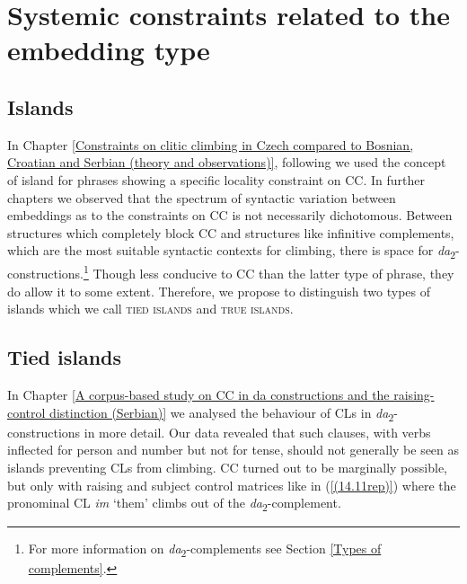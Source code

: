 \section{Systemic constraints related to the embedding type}
\label{Systemic constraints related to the embedding type}
\subsection{Islands}
\label{Islands}

In Chapter \ref{Constraints on clitic climbing in Czech compared to Bosnian, Croatian and Serbian (theory and observations)}, following \citet[][245]{FranksKing00} we used the concept of island for phrases showing a specific locality constraint on CC. In further chapters we observed that the spectrum of syntactic variation between embeddings as to the constraints on CC is not necessarily dichotomous. Between structures which completely block CC and structures like infinitive complements, which are the most suitable syntactic contexts for climbing, there is space for \textit{da}\textsubscript{2}-con\-struc\-tions.\footnote{For more information on \textit{da}\textsubscript{2}-complements see Section \ref{Types of complements}.} Though less conducive to CC than the latter type of phrase, they do allow it to some extent. Therefore, we propose to distinguish two types of islands which we call \textsc{tied} \textsc{islands} and \textsc{true islands}. 

\subsection{Tied islands}
\label{Tied islands}

In Chapter \ref{A corpus-based study on CC in da constructions and the raising-control distinction (Serbian)} we analysed the behaviour of CLs in \textit{da}\textsubscript{2}-constructions in more detail. Our data revealed that such clauses, with verbs inflected for person and number but not for tense, should not generally be seen as islands preventing CLs from climbing. CC turned out to be marginally possible, but only with raising and subject control matrices like in (\ref{(14.11rep)}) where the pronominal CL \textit{im} ‘them’ climbs out of the \textit{da}\textsubscript{2}-complement.


